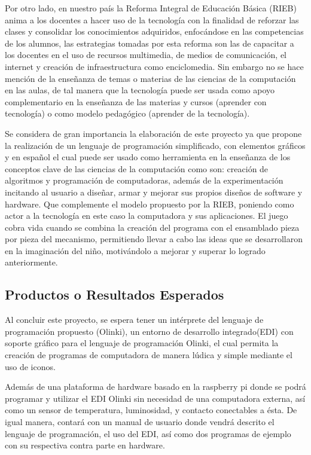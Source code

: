 \documentclass[letterpaper,10pt]{article}
\begin{document}
Por otro lado, en nuestro país la Reforma Integral de Educación Básica (RIEB) anima
a los docentes a hacer uso de
la tecnología con la finalidad de reforzar las clases y consolidar los conocimientos adquiridos,
enfocándose en las competencias de los alumnos, las estrategias tomadas por esta reforma son las
de capacitar a los docentes en el uso de recursos multimedia, de medios de comunicación, 
el internet y creación de infraestructura como enciclomedia. Sin embargo no se hace mención 
de la enseñanza de temas o materias de las ciencias de la computación en las aulas, 
de tal manera que la 
tecnología puede ser usada como apoyo complementario en la enseñanza de las materias y cursos 
(aprender con tecnología) o como modelo pedagógico (aprender de la tecnología).\newline

Se considera de gran importancia la elaboración de este proyecto ya que propone la realización
de un lenguaje de programación simplificado, con elementos gráficos y en español el cual
puede ser usado como herramienta en la enseñanza de los conceptos clave de las ciencias de la 
computación como son: creación de algoritmos y programación de computadoras, además de la 
experimentación incitando al usuario a diseñar, armar y mejorar sus propios diseños de software
y hardware. Que complemente el modelo propuesto por la RIEB, poniendo como actor a la tecnología
en este caso la computadora y sus aplicaciones.\newline
El juego cobra vida cuando se combina la creación del programa con el ensamblado 
pieza por pieza del mecanismo, permitiendo llevar a cabo las ideas que se 
desarrollaron en la imaginación del niño, motivándolo a mejorar y  superar lo logrado
anteriormente.



\subsection{Productos o Resultados Esperados}

Al concluir este proyecto, se espera tener un intérprete del lenguaje de programación
propuesto (Olinki), un entorno de desarrollo integrado(EDI)
con soporte gráfico para el lenguaje de programación Olinki, el cual permita la creación
de programas de computadora de manera lúdica y simple mediante el uso de iconos.

Además de una plataforma de hardware basado en la raspberry pi donde se podrá programar y utilizar el EDI Olinki 
sin necesidad de una computadora externa, así como un sensor de temperatura, luminosidad, y contacto
 conectables a ésta.\newline
 De igual manera, contará con un manual de usuario donde vendrá descrito el lenguaje de programación,
 el uso del EDI, así como dos programas de ejemplo con su respectiva contra parte en hardware.
 
\end{document}
